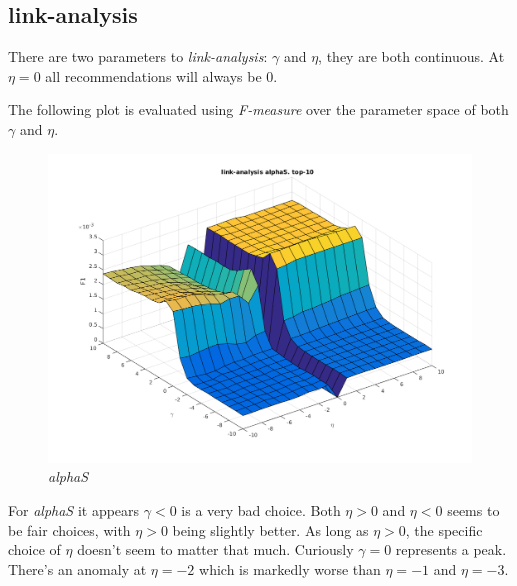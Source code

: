 
\subsection{link-analysis}

There are two parameters to \textit{link-analysis}: $\gamma$ and $\eta$, they are both continuous. At $\eta = 0$ all recommendations will always be 0.

The following plot is evaluated using \textit{F-measure}  over the parameter space of both $\gamma$ and $\eta$.

\begin{figure}[h!]
    \includegraphics[width=\textwidth]{fig/link_eta_gamma/alphaS_link.png}
    \caption{\textit{alphaS}}
    \label{fig:linkalphaS}
\end{figure}

For \textit{alphaS} it appears $\gamma < 0$ is a very bad choice. Both $\eta > 0$ and $\eta < 0$ seems to be fair choices, with $\eta > 0$ being slightly better. As long as $\eta > 0$, the specific choice of $\eta$ doesn't seem to matter that much. Curiously $\gamma = 0$ represents a peak. There's an anomaly at $\eta = -2$ which is markedly worse than $\eta = -1$ and $\eta = -3$.

\FloatBarrier

